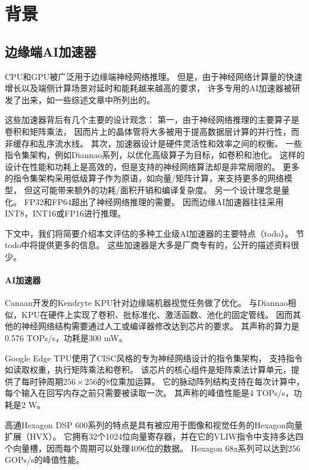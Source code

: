 \section{背景}
\label{background}

\subsection{边缘端AI加速器}
CPU和GPU被广泛用于边缘端神经网络推理。
但是，由于神经网络计算量的快速增长以及端侧计算场景对延时和能耗越来越高的要求，
许多专用的AI加速器被研发了出来，如一些综述文章\cite{chen2020survey, reuther2019survey}中所列出的。

这些加速器背后有几个主要的设计观念：
第一，由于神经网络推理的主要算子是卷积和矩阵乘法，
因而片上的晶体管将大多被用于提高数据层计算的并行性，而非缓存和乱序流水线\cite{jouppi2018domain}。
其次，加速器设计是硬件灵活性和效率之间的权衡。
一些指令集架构，例如Diannao系列\cite{chen2014diannao}，以优化高级算子为目标，如卷积和池化。
这样的设计在性能和功耗上是高效的，但是支持的神经网络算法却是非常局限的。
更多的指令集架构采用低级算子作为原语，如向量/矩阵计算，来支持更多的网络模型，
但这可能带来额外的功耗/面积开销\cite{liu2016cambricon}和编译复杂度。
另一个设计理念是量化。
FP32和FP64超出了神经网络推理的需要\cite{hennessy2019new}。
因而边缘AI加速器往往采用INT8，INT16或FP16进行推理。

下文中，我们将简要介绍本文评估的多种工业级AI加速器的主要特点（todo）。
节todo中将提供更多的信息。
这些加速器是大多是厂商专有的，公开的描述资料很少。

\paragraph{AI加速器}
Canaan开发的Kendryte KPU\cite{k210}针对边缘端机器视觉任务做了优化。
与Diannao相似，KPU在硬件上实现了卷积、批标准化、激活函数、池化的固定管线。
因而其他的神经网络结构需要通过人工或编译器修改达到芯片的要求。
其声称的算力是0.576 TOPs/s，功耗是300 mW。

Google Edge TPU\cite{jouppi2018domain}使用了CISC风格的专为神经网络设计的指令集架构，
支持指令如读取权重，执行矩阵乘法和卷积。
该芯片的核心组件是矩阵乘法计算单元，提供了每时钟周期$256\times 256$的8位乘加运算。
它的脉动阵列结构\cite{kung1979systolic}支持在每次计算中，每个输入在回写内存之前只需要被读取一次。
其声称的峰值性能是4 TOPs/s，功耗是2 W。

高通Hexagon DSP 600系列\cite{dsp}的特点是具有被应用于图像和视觉任务的Hexagon向量扩展（HVX）。
它拥有32个1024位向量寄存器，并在它的VLIW指令中支持多达四个向量槽，因而每个周期可以处理4096位的数据。
Hexagon 68x系列可以达到256 GOPs/s的峰值性能。

